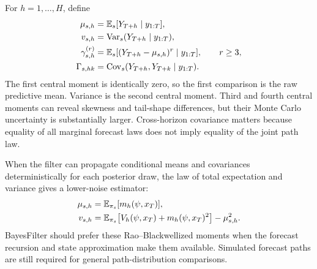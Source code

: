 For $h=1,\ldots,H$, define
\begin{align}
  \mu_{s,h}
    &= \mathbb{E}_s[Y_{T+h}\mid y_{1:T}],                                         \\
  v_{s,h}
    &= \operatorname{Var}_s(Y_{T+h}\mid y_{1:T}),                                      \\
  \gamma_{s,h}^{(r)}
    &= \mathbb{E}_s[(Y_{T+h}-\mu_{s,h})^r\mid y_{1:T}],\qquad r\geq 3,            \\
  \Gamma_{s,hk}
    &= \operatorname{Cov}_s(Y_{T+h},Y_{T+k}\mid y_{1:T}).
  \label{eq:bf-ssl-lstm-predictive-moments}
\end{align}
The first central moment is identically zero, so the first comparison is the
raw predictive mean.  Variance is the second central moment.  Third and fourth
central moments can reveal skewness and tail-shape differences, but their Monte
Carlo uncertainty is substantially larger.  Cross-horizon covariance matters
because equality of all marginal forecast laws does not imply equality of the
joint path law.

When the filter can propagate conditional means and covariances
deterministically for each posterior draw, the law of total expectation and
variance gives a lower-noise estimator:
\begin{align}
  \mu_{s,h}
    &= \mathbb{E}_{\pi_s}[m_h(\psi,x_T)],                                         \\
  v_{s,h}
    &= \mathbb{E}_{\pi_s}\!\left[V_h(\psi,x_T)+m_h(\psi,x_T)^2\right]
       -\mu_{s,h}^2.
  \label{eq:bf-ssl-lstm-rao-blackwell-moments}
\end{align}
BayesFilter should prefer these Rao--Blackwellized moments when the forecast
recursion and state approximation make them available.  Simulated forecast
paths are still required for general path-distribution comparisons.

